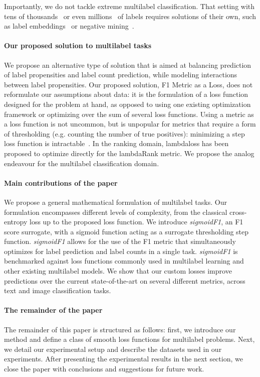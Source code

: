 Importantly, we do not tackle extreme multilabel classification. That setting with tens of thousands~\cite{extremeClassification} or even millions~\cite{millionsOfLabels, extremeMilliionsSlice} of labels requires solutions of their own, such as label embeddings~\cite{extremeMultilabelEmbeddings} or negative mining~\cite{stochasticNegativeMining}.

\paragraph{Our proposed solution to multilabel tasks}
We propose an alternative type of solution that is aimed at balancing prediction of label propensities and label count prediction, while modeling interactions between label propensities. Our proposed solution, F1 Metric as a Loss, does not reformulate our assumptions about data: it is the formulation of a loss function designed for the problem at hand, as opposed to using one existing optimization framework or optimizing over the sum of several loss functions.
Using a metric as a loss function is not uncommon, but is unpopular for metrics that require a form of thresholding (e.g. counting the number of true positives): minimizing a step loss function is intractable~\cite{stochasticNegativeMining}. In the ranking domain, lambdaloss has been proposed to optimize directly for the lambdaRank metric. We propose the analog endeavour for the multilabel classification domain.

\paragraph{Main contributions of the paper}
We propose a general mathematical formulation of multilabel tasks.
Our formulation encompasses different levels of complexity, from the classical cross-entropy loss up to the proposed loss function. We introduce \emph{sigmoidF1}, an F1 score surrogate, with a sigmoid function acting as a surrogate thresholding step function.
\emph{sigmoidF1} allows for the use of the F1 metric that simultaneously optimizes for label prediction and label counts in a single task.
\emph{sigmoidF1} is benchmarked against loss functions commonly used in multilabel learning and other existing multilabel models. We show that our custom losses improve predictions over the current state-of-the-art on several different metrics, across text and image classification tasks.

\paragraph{The remainder of the paper}
The remainder of this paper is structured as follows: first, we introduce our method and define a class of smooth loss functions for multilabel problems. Next, we detail our experimental setup and describe the datasets used in our experiments. After presenting the experimental results in the next section, we close the paper with conclusions and suggestions for future work.





